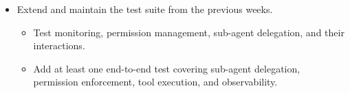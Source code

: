 \documentclass{article}
\begin{document}
\begin{itemize}
\begin{itemize}
        \item The parent agent must be able to delegate a task to a sub-agent and receive a result that can be incorporated into the parent context.
        \item Demonstrate at least two specialized sub-agent configurations and at least one task that benefits from delegation.
        \item Record properly sub-agent executions as part of the corresponding parent run in the observability data.
    \end{itemize}
    \item Extend and maintain the test suite from the previous weeks.
    \begin{itemize}
        \item Test monitoring, permission management, sub-agent delegation, and their interactions.
        \item Add at least one end-to-end test covering sub-agent delegation, permission enforcement, tool execution, and observability.
    \end{itemize}
\end{itemize}




 
\end{document}
